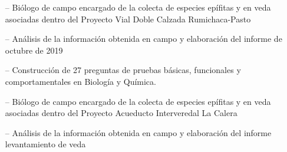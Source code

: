 \documentclass[10pt,legalpaper]{altacv}
\begin{document}
\tagline{}

\begin{fullwidth}
\makecvheader
\end{fullwidth}



\begin{itemize}
    \setlength{\itemindent}{0.5em}
    \item[--]   \small{Biólogo de campo encargado de la colecta de especies epífitas y en veda asociadas dentro del Proyecto Vial Doble Calzada Rumichaca-Pasto}
    \item[--]   \small{Análisis de la información obtenida en campo y elaboración del informe de octubre de 2019}
\end{itemize}
\medskip

\begin{itemize}
    \setlength{\itemindent}{0.5em}
    \item[--]   \small{Construcción de 27 preguntas de pruebas básicas, funcionales y comportamentales en Biología y Química.}
\end{itemize}
\medskip

\begin{itemize}
    \setlength{\itemindent}{0.5em}
    \item[--]   \small{Biólogo de campo encargado de la colecta de especies epífitas y en veda asociadas dentro del Proyecto Acueducto Interveredal La Calera}
    \item[--]   \small{Análisis de la información obtenida en campo y elaboración del informe levantamiento de veda}
\end{itemize}
\medskip
\end{document}
